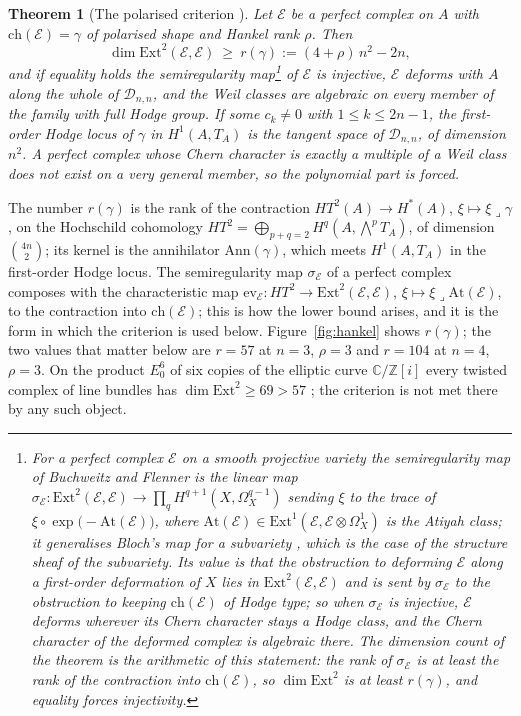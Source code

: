 \documentclass[11pt,reqno]{amsart}
\numberwithin{equation}{section}
\theoremstyle{plain}
\newtheorem{theorem}{Theorem}[section]
\theoremstyle{definition}
\newcommand{\ZZ}{\mathbb{Z}}
\newcommand{\CC}{\mathbb{C}}
\newcommand{\Ext}{\mathrm{Ext}}
\newcommand{\ch}{\mathrm{ch}}
\newcommand{\cD}{\mathcal{D}}
\begin{document}
\begin{theorem}[The polarised criterion ]\label{thm:criterion}
Let $\mathcal{E}$ be a perfect complex on $A$ with $\ch(\mathcal{E})=\gamma$ of polarised shape and Hankel rank $\rho$. Then
\[
\dim\Ext^{2}(\mathcal{E},\mathcal{E})\ \ge\ r(\gamma):=(4+\rho)\,n^{2}-2n,
\]
and if equality holds the semiregularity map\footnote{For a perfect complex $\mathcal{E}$ on a smooth projective variety the semiregularity map of Buchweitz and Flenner \cite{BF03} is the linear map $\sigma_{\mathcal{E}}\colon\Ext^{2}(\mathcal{E},\mathcal{E})\to\prod_{q}H^{q+1}(X,\Omega^{q-1}_{X})$ sending $\xi$ to the trace of $\xi\circ\exp\bigl(-\mathrm{At}(\mathcal{E})\bigr)$, where $\mathrm{At}(\mathcal{E})\in\Ext^{1}(\mathcal{E},\mathcal{E}\otimes\Omega^{1}_{X})$ is the Atiyah class; it generalises Bloch's map for a subvariety \cite{Blo72}, which is the case of the structure sheaf of the subvariety. Its value is that the obstruction to deforming $\mathcal{E}$ along a first-order deformation of $X$ lies in $\Ext^{2}(\mathcal{E},\mathcal{E})$ and is sent by $\sigma_{\mathcal{E}}$ to the obstruction to keeping $\ch(\mathcal{E})$ of Hodge type; so when $\sigma_{\mathcal{E}}$ is injective, $\mathcal{E}$ deforms wherever its Chern character stays a Hodge class, and the Chern character of the deformed complex is algebraic there. The dimension count of the theorem is the arithmetic of this statement: the rank of $\sigma_{\mathcal{E}}$ is at least the rank of the contraction into $\ch(\mathcal{E})$, so $\dim\Ext^{2}$ is at least $r(\gamma)$, and equality forces injectivity.} of $\mathcal{E}$ is injective, $\mathcal{E}$ deforms with $A$ along the whole of $\cD_{n,n}$, and the Weil classes are algebraic on every member of the family with full Hodge group. If some $c_{k}\ne0$ with $1\le k\le 2n-1$, the first-order Hodge locus of $\gamma$ in $H^{1}(A,T_{A})$ is the tangent space of $\cD_{n,n}$, of dimension $n^{2}$. A perfect complex whose Chern character is exactly a multiple of a Weil class does not exist on a very general member, so the polynomial part is forced.
\end{theorem}

The number $r(\gamma)$ is the rank of the contraction $HT^{2}(A)\to H^{*}(A)$, $\xi\mapsto\xi\lrcorner\gamma$, on the Hochschild cohomology $HT^{2}=\bigoplus_{p+q=2}H^{q}(A,\bigwedge^{p}T_{A})$, of dimension $\binom{4n}{2}$; its kernel is the annihilator $\mathrm{Ann}(\gamma)$, which meets $H^{1}(A,T_{A})$ in the first-order Hodge locus. The semiregularity map $\sigma_{\mathcal{E}}$ of a perfect complex composes with the characteristic map $\mathrm{ev}_{\mathcal{E}}:HT^{2}\to\Ext^{2}(\mathcal{E},\mathcal{E})$, $\xi\mapsto\xi\lrcorner\mathrm{At}(\mathcal{E})$, to the contraction into $\ch(\mathcal{E})$; this is how the lower bound arises, and it is the form in which the criterion is used below. Figure~\ref{fig:hankel} shows $r(\gamma)$; the two values that matter below are $r=57$ at $n=3$, $\rho=3$ and $r=104$ at $n=4$, $\rho=3$. On the product $E_{0}^{6}$ of six copies of the elliptic curve $\CC/\ZZ[i]$ every twisted complex of line bundles has $\dim\Ext^{2}\ge69>57$ \cite[Thm.~18.35]{BMB26}; the criterion is not met there by any such object.
\end{document}
